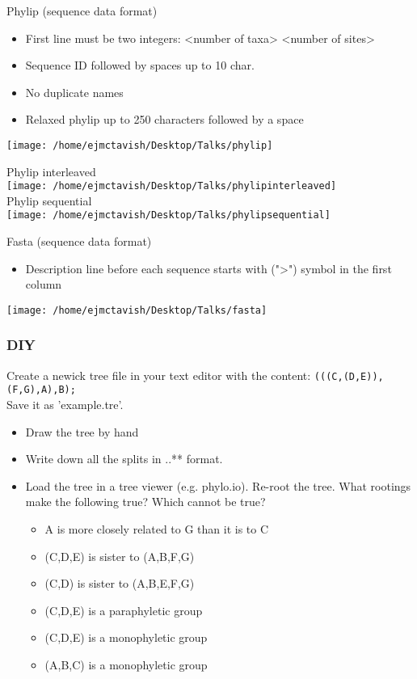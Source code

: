 \documentclass{beamer}
\begin{document}
\begin{frame}
 Phylip (sequence data format)\\
\begin{itemize}
 \item First line must be two integers: <number of taxa> <number of sites>
 \item Sequence ID followed by spaces up to 10 char. 
 \item No duplicate names
 \item Relaxed phylip up to 250 characters followed by a space
\end{itemize}
\texttt{[image: /home/ejmctavish/Desktop/Talks/phylip]}
\end{frame}

\begin{frame}
Phylip interleaved\\
\texttt{[image: /home/ejmctavish/Desktop/Talks/phylipinterleaved]}\\
Phylip sequential\\
\texttt{[image: /home/ejmctavish/Desktop/Talks/phylipsequential]}
\end{frame}



\begin{frame}
Fasta (sequence data format)\\
\begin{itemize}
 \item Description line before each sequence starts with (">") symbol in the first column
\end{itemize}
\texttt{[image: /home/ejmctavish/Desktop/Talks/fasta]}
\end{frame}



\begin{frame}
\frametitle{DIY}
Create a newick tree file in your text editor with the content:
\texttt{(((C,(D,E)),(F,G),A),B);}\\
Save it as 'example.tre'.\\
\begin{itemize}
 \item Draw the tree by hand
 \item Write down all the splits in ..** format.
 \item Load the tree in a tree viewer (e.g. phylo.io). Re-root  the tree. What rootings make the following true? Which cannot be true?
 \begin{itemize}
 \item A is more closely related to G than it is to C
 \item (C,D,E) is sister to (A,B,F,G)
 \item (C,D) is sister to (A,B,E,F,G)
 \item (C,D,E) is a paraphyletic group
 \item (C,D,E) is a monophyletic group
 \item (A,B,C) is a monophyletic group
 \end{itemize}
\end{itemize}
\end{frame}
\end{document}
